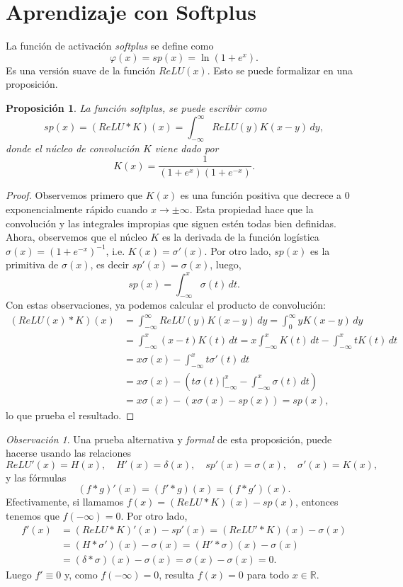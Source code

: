 \documentclass[12pt, a4paper]{amsbook}
\newcommand{\R}{{\mathbb R}}
\newtheorem{prop}[teo]{Proposici\'on}
\theoremstyle{remark}
\newtheorem{obs}[teo]{Observaci\'on}
\theoremstyle{definition}
\numberwithin{section}{chapter}
\numberwithin{subsection}{section}
\numberwithin{equation}{section}
\numberwithin{figure}{chapter}
\begin{document}
\section{Aprendizaje con Softplus}\label{sec.c8.5}
La función de activación {\em softplus} se define como
$$
\varphi(x) = sp(x) = \ln(1+e^x).
$$
Es una versión suave de la función $ReLU(x)$. Esto se puede formalizar en una proposición.
\begin{prop}\label{K.conv}
La función softplus, se puede escribir como
$$
sp(x) = (ReLU * K)(x) = \int_{-\infty}^\infty ReLU(y) K(x-y)\, dy,
$$
donde el {\em núcleo de convolución} $K$ viene dado por
$$
K(x) = \frac{1}{(1+e^x)(1+e^{-x})}.
$$
\end{prop}

\begin{proof}
Observemos primero que $K(x)$ es una función positiva que decrece a 0 exponencialmente rápido cuando $x\to\pm \infty$. Esta propiedad hace que la convolución y las integrales impropias que siguen estén todas bien definidas. Ahora, observemos que el núcleo $K$ es la derivada de la función logística $\sigma(x) = (1+e^{-x})^{-1}$, i.e. $K(x) = \sigma'(x)$. Por otro lado, $sp(x)$ es la primitiva de $\sigma(x)$, es decir $sp'(x) = \sigma(x)$, luego,
$$
sp(x) = \int_{-\infty}^x \sigma(t)\, dt.
$$
Con estas observaciones, ya podemos calcular el producto de convolución:
\begin{align*}
(ReLU(x)* K)(x) &= \int_{-\infty}^\infty ReLU(y) K(x-y)\, dy = \int_0^\infty y K(x-y)\, dy\\
&= \int_{-\infty}^x (x-t)K(t)\, dt = x\int_{-\infty}^x K(t)\, dt - \int_{-\infty}^x tK(t)\, dt\\
&= x\sigma(x) - \int_{-\infty}^x t\sigma'(t)\, dt\\
&=x\sigma(x) - \left(t\sigma(t)\Big|_{-\infty}^x - \int_{-\infty}^x \sigma(t)\, dt\right)\\
&=x\sigma(x) - \left(x\sigma(x) - sp(x)\right) = sp(x),
\end{align*}
lo que prueba el resultado.
\end{proof}

\begin{obs}
Una prueba alternativa y {\em formal} de esta proposición, puede hacerse usando las relaciones
$$
ReLU'(x) = H(x),\quad H'(x) = \delta(x),\quad sp'(x) = \sigma(x),\quad \sigma'(x) = K(x),
$$
y las fórmulas
$$
(f*g)'(x) = (f' * g)(x) = (f* g')(x).
$$
Efectivamente, si llamamos $f(x) = (ReLU * K)(x) - sp(x)$, entonces tenemos que $f(-\infty)=0$. Por otro lado,
\begin{align*}
f'(x) &= (ReLU * K)'(x) - sp'(x) = (ReLU' * K)(x) - \sigma(x)\\
&= (H * \sigma') (x) - \sigma(x) = (H'*\sigma)(x) - \sigma(x)\\
&=(\delta*\sigma)(x) - \sigma(x) = \sigma(x) - \sigma(x) = 0.
\end{align*}
Luego $f'\equiv0$ y, como $f(-\infty)=0$, resulta $f(x)=0$ para todo $x\in\R$.
\end{obs}
\end{document}
